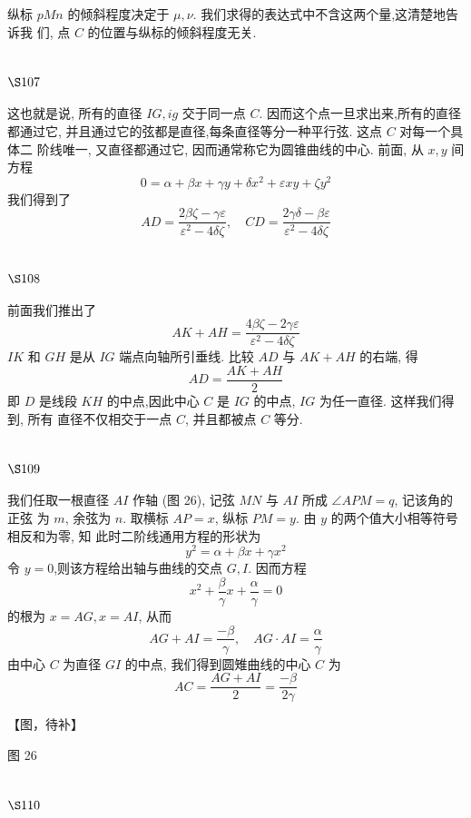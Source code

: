 纵标 $p M n$ 的倾斜程度决定于 $\mu, \nu$. 我们求得的表达式中不含这两个量,这清楚地告诉我 们, 点 $C$ 的位置与纵标的倾斜程度无关.

\section{$\S 107$}

这也就是说, 所有的直径 $I G, i g$ 交于同一点 $C$. 因而这个点一旦求出来,所有的直径 都通过它, 并且通过它的弦都是直径,每条直径等分一种平行弦. 这点 $C$ 对每一个具体二 阶线唯一, 又直径都通过它, 因而通常称它为圆锥曲线的中心. 前面, 从 $x, y$ 间方程
\[
0=\alpha+\beta x+\gamma y+\delta x^{2}+\varepsilon x y+\zeta y^{2}
\]
我们得到了
\[
A D=\frac{2 \beta \zeta-\gamma \varepsilon}{\varepsilon^{2}-4 \delta \zeta}, \quad C D=\frac{2 \gamma \delta-\beta \varepsilon}{\varepsilon^{2}-4 \delta \zeta}
\]
\section{$\S 108$}

前面我们推出了
\[
A K+A H=\frac{4 \beta \zeta-2 \gamma \varepsilon}{\varepsilon^{2}-4 \delta \zeta}
\]
$I K$ 和 $G H$ 是从 $I G$ 端点向轴所引垂线. 比较 $A D$ 与 $A K+A H$ 的右端, 得
\[
A D=\frac{A K+A H}{2}
\]
即 $D$ 是线段 $K H$ 的中点,因此中心 $C$ 是 $I G$ 的中点, $I G$ 为任一直径. 这样我们得到, 所有 直径不仅相交于一点 $C$, 并且都被点 $C$ 等分.

\section{$\S 109$}

我们任取一根直径 $A I$ 作轴 (图 26), 记弦 $M N$ 与 $A I$ 所成 $\angle A P M=q$, 记该角的正弦 为 $m$, 余弦为 $n$. 取横标 $A P=x$, 纵标 $P M=y$. 由 $y$ 的两个值大小相等符号相反和为零, 知 此时二阶线通用方程的形状为
\[
y^{2}=\alpha+\beta x+\gamma x^{2}
\]
令 $y=0$,则该方程给出轴与曲线的交点 $G, I$. 因而方程
\[
x^{2}+\frac{\beta}{\gamma} x+\frac{\alpha}{\gamma}=0
\]
的根为 $x=A G, x=A I$, 从而
\[
A G+A I=\frac{-\beta}{\gamma}, \quad A G \cdot A I=\frac{\alpha}{\gamma}
\]
由中心 $C$ 为直径 $G I$ 的中点, 我们得到圆雉曲线的中心 $C$ 为 
\[
A C=\frac{A G+A I}{2}=\frac{-\beta}{2 \gamma}
\]

【图，待补】

图 26

\section{$\S 110$}

